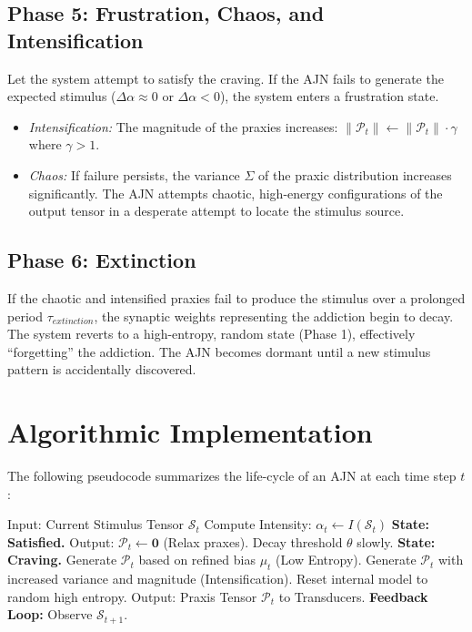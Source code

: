 \documentclass[12pt,a4paper]{article}
\begin{document}
\subsection{Phase 5: Frustration, Chaos, and Intensification}
Let the system attempt to satisfy the craving. If the AJN fails to generate the expected stimulus ($\Delta \alpha \approx 0$ or $\Delta \alpha < 0$), the system enters a frustration state.
\begin{itemize}
    \item \textit{Intensification:} The magnitude of the praxies increases: $\|\mathcal{P}_t\| \leftarrow \|\mathcal{P}_t\| \cdot \gamma$ where $\gamma > 1$.
    \item \textit{Chaos:} If failure persists, the variance $\Sigma$ of the praxic distribution increases significantly. The AJN attempts chaotic, high-energy configurations of the output tensor in a desperate attempt to locate the stimulus source.
\end{itemize}

\subsection{Phase 6: Extinction}
If the chaotic and intensified praxies fail to produce the stimulus over a prolonged period $\tau_{extinction}$, the synaptic weights representing the addiction begin to decay. The system reverts to a high-entropy, random state (Phase 1), effectively ``forgetting'' the addiction. The AJN becomes dormant until a new stimulus pattern is accidentally discovered.

\section{Algorithmic Implementation}

The following pseudocode summarizes the life-cycle of an AJN at each time step $t$:

\begin{algorithm}[H]
\caption{AJN Processing Cycle}
\begin{algorithmic}[1]
\STATE Input: Current Stimulus Tensor $\mathcal{S}_t$ \STATE Compute Intensity: $\alpha_t \leftarrow I(\mathcal{S}_t)$ 
    \STATE \textbf{State: Satisfied.}
    \STATE Output: $\mathcal{P}_t \leftarrow \mathbf{0}$ (Relax praxes).
    \STATE Decay threshold $\theta$ slowly.
\ELSE
    \STATE \textbf{State: Craving.}
        \STATE Generate $\mathcal{P}_t$ based on refined bias $\mu_{t}$ (Low Entropy).
        \STATE Generate $\mathcal{P}_t$ with increased variance and magnitude (Intensification).
            \STATE Reset internal model to random high entropy.
        \ENDIF
    \ENDIF
\ENDIF
\STATE Output: Praxis Tensor $\mathcal{P}_t$ to Transducers.
\STATE \textbf{Feedback Loop:} Observe $\mathcal{S}_{t+1}$.
\end{algorithmic}
\end{algorithm}
\end{document}
